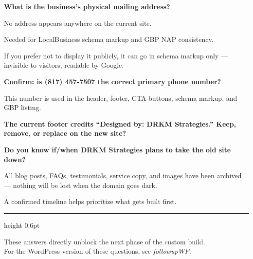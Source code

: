 \documentclass[11pt, letterpaper]{article}
\begin{document}
\begin{checklist}
  \item \textbf{What is the business's physical mailing address?}
    \begin{checklist}
      \item No address appears anywhere on the current site.
      \item Needed for LocalBusiness schema markup and GBP NAP consistency.
      \item If you prefer not to display it publicly, it can go in schema
            markup only --- invisible to visitors, readable by Google.
    \end{checklist}

  \item \textbf{Confirm: is (817) 457-7507 the correct primary phone number?}
    \begin{checklist}
      \item This number is used in the header, footer, CTA buttons, schema
            markup, and GBP listing.
    \end{checklist}

  \item \textbf{The current footer credits ``Designed by: DRKM Strategies.''
    Keep, remove, or replace on the new site?}

  \item \textbf{Do you know if/when DRKM Strategies plans to take the old
    site down?}
    \begin{checklist}
      \item All blog posts, FAQs, testimonials, service copy, and images have
            been archived --- nothing will be lost when the domain goes dark.
      \item A confirmed timeline helps prioritize what gets built first.
    \end{checklist}
\end{checklist}

\vspace{16pt}
{\color{accent}\hrule height 0.6pt}
\vspace{8pt}

\begin{center}
  \small\color{midgray}
  These answers directly unblock the next phase of the custom build.\\
  For the WordPress version of these questions, see \emph{followupWP}.
\end{center}
\end{document}
